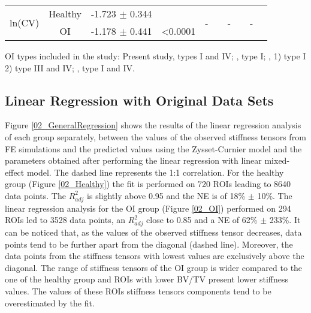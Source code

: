 \documentclass[a4paper,fleqn]{DC_ArtStyle}
\begin{document}
\begin{sidewaystable*}
{\begin{tabular}{cccccccccc}
				\multirow{3}{*}{ln(CV)} & Healthy & -1.723 $\pm$ 0.344 & & \multirow{3}{*}{-} & & \multirow{3}{*}{-} & & \multirow{3}{*}{-} &  \\
				& \multirow{2}{*}{OI} & \multirow{2}{*}{-1.178 $\pm$ 0.441} & \multirow{2}{*}{<0.0001} & & & & & & \\
				& & & & & & & & & \\
				
				\bottomrule
		\end{tabular}}
		OI types included in the study: Present study, types I and IV; \citeauthor{Folkestad2012}\cite{Folkestad2012}, type I; \citeauthor{Kocijan2015}\cite{Kocijan2015}, 1) type I 2) type III and IV; \citeauthor{Rolvien2018}\cite{Rolvien2018}, type I and IV.
	\end{sidewaystable*}
	
	\subsection{Linear Regression with Original Data Sets}
	Figure \ref{02_GeneralRegression} shows the results of the linear regression analysis of each group separately, between the values of the observed stiffness tensors from \si{\micro}FE simulations and the predicted values using the Zysset-Curnier model\cite{Zysset1995} and the parameters obtained after performing the linear regression with linear mixed-effect model. The dashed line represents the 1:1 correlation. For the healthy group (Figure \ref{02_Healthy}) the fit is performed on 720 ROIs leading to 8640 data points. The $R^2_{adj}$ is slightly above 0.95 and the NE is of 18\% $\pm$ 10\%. The linear regression analysis for the OI group (Figure \ref{02_OI}) performed on 294 ROIs led to 3528 data points, an $R^2_{adj}$ close to 0.85 and a NE of 62\% $\pm$ 233\%. It can be noticed that, as the values of the observed stiffness tensor decreases, data points tend to be further apart from the diagonal (dashed line). Moreover, the data points from the stiffness tensors with lowest values are exclusively above the diagonal. The range of stiffness tensors of the OI group is wider compared to the one of the healthy group and ROIs with lower BV/TV present lower stiffness values. The values of these ROIs stiffness tensors components tend to be overestimated by the fit.\\
	
\end{document}
